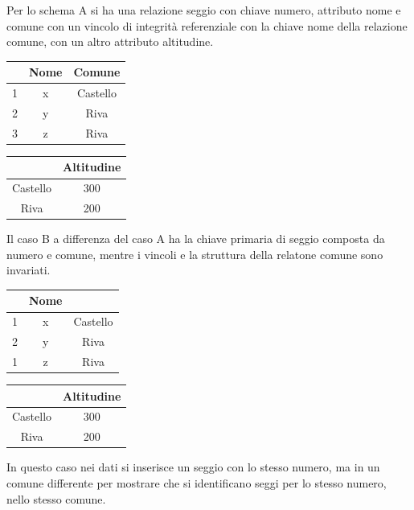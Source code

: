 \documentclass{article}
\numberwithin{equation}{subsection}
\newcommand{\myuline}[1]{%
  \uline{\phantom{#1}}%
  \llap{\contour{white}{#1}}%
}
\begin{document}
Per lo schema A si ha una relazione seggio con chiave numero, attributo nome e comune con un vincolo di integrità referenziale con la chiave nome 
della relazione comune, con un altro attributo altitudine. 
\begin{center}
    \begin{tabular}{|c|c|c|}
        \hline 
        \myuline{Numero} & Nome & Comune\\
        \hline
        1 & x & Castello\\
        \hline
        2 & y & Riva\\
        \hline
        3 & z & Riva\\
        \hline
    \end{tabular}
    \begin{tabular}{|c|c|}
        \hline
        \myuline{Nome} & Altitudine\\
        \hline
        Castello & 300\\
        \hline
        Riva & 200\\
        \hline
    \end{tabular}
\end{center}
Il caso B a differenza del caso A ha la chiave primaria di seggio composta da numero e comune, mentre i vincoli e la struttura della relatone 
comune sono invariati. 
\begin{center}
    \begin{tabular}{|c|c|c|}
        \hline 
        \myuline{Numero} & Nome & \myuline{Comune}\\
        \hline
        1 & x & Castello\\
        \hline
        2 & y & Riva\\
        \hline
        1 & z & Riva\\
        \hline
    \end{tabular}
    \begin{tabular}{|c|c|}
        \hline
        \myuline{Nome} & Altitudine\\
        \hline
        Castello & 300\\
        \hline
        Riva & 200\\
        \hline
    \end{tabular}
\end{center}
In questo caso nei dati si inserisce un seggio con lo stesso numero, ma in un comune differente per mostrare che si identificano seggi per lo 
stesso numero, nello stesso comune. 
\end{document}
